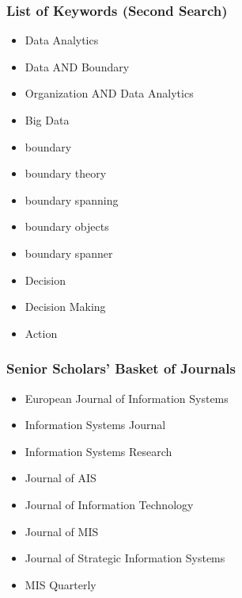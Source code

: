 \subsubsection*{List of Keywords (Second Search)}

\begin{itemize}
    \item Data Analytics
	\item Data AND Boundary
	\item Organization AND Data Analytics
	\item Big Data
	\item boundary 
	\item boundary theory
	\item boundary spanning
	\item boundary objects
    \item boundary spanner
    \item Decision
    \item Decision Making
    \item Action
\end{itemize}

\subsubsection*{Senior Scholars' Basket of Journals}\label{appendix:subsec:seniorScholar}
\begin{itemize}
    \item European Journal of Information Systems
    \item Information Systems Journal 
    \item Information Systems Research
    \item Journal of AIS
    \item Journal of Information Technology
    \item Journal of MIS
    \item Journal of Strategic Information Systems
    \item MIS Quarterly
\end{itemize}

